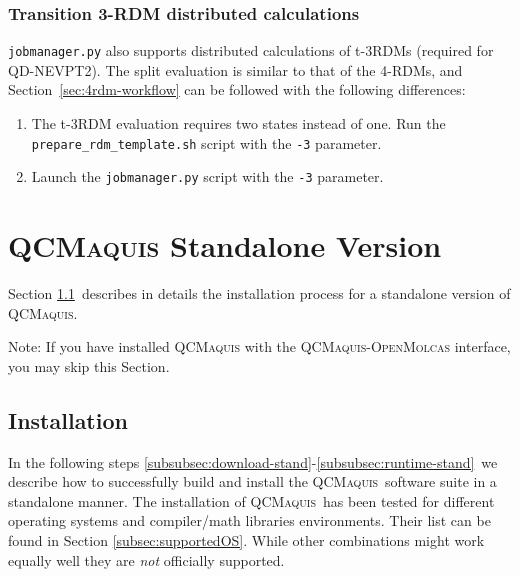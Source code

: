\documentclass[bibliography=totoc,12pt,a4paper]{scrartcl}
\newcommand{\mol}{\textsc{OpenMolcas}}
\newcommand{\qcm}{\textsc{QCMaquis}}
\newcommand{\kwd}[1]{\texttt{#1}}
\begin{document}
\subsubsection{Transition 3-RDM distributed calculations}
\kwd{jobmanager.py} also supports distributed calculations of t-3RDMs (required for QD-NEVPT2). The split evaluation is similar to that of the 4-RDMs, and Section~\ref{sec:4rdm-workflow} can be followed with the following differences:
\begin{enumerate}
 \item The t-3RDM evaluation requires two states instead of one. Run the \\
 \kwd{prepare\_rdm\_template.sh} script with the \kwd{-3} parameter.
 \item Launch the \kwd{jobmanager.py} script with the \kwd{-3} parameter.
\end{enumerate}

\clearpage
\newpage

\section{\qcm{} Standalone Version}

Section \ref{sec:install-qcm-stand}\ describes in details the installation process for a standalone version of \qcm.
\begin{framed}
\noindent Note: If you have installed \qcm{} with the \qcm{}-\mol{} interface, you may skip this Section.
\end{framed}



\subsection{Installation}\label{sec:install-qcm-stand}

\noindent In the following steps \ref{subsubsec:download-stand}-\ref{subsubsec:runtime-stand}\ we describe how to successfully build and install  the \qcm\ software suite in a standalone manner.
The installation of \qcm\ has been tested for different operating systems and compiler/math libraries environments. Their list can be found in Section \ref{subsec:supportedOS}.
While other combinations might work equally well they are \emph{not} officially supported.
\end{document}
